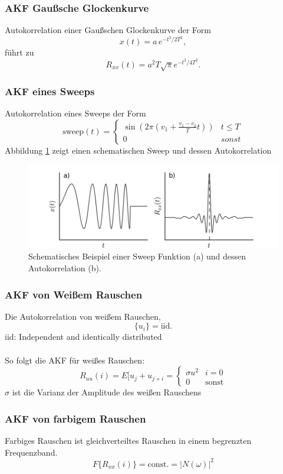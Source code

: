 \subsubsection*{AKF Gaußsche Glockenkurve}
Autokorrelation einer Gaußschen Glockenkurve der Form
\[
x(t) = a\,e^{-t^2/2T^2},
\]
führt zu
\[
R_{xx}(t) = a^2 T \sqrt{\pi} e^{-t^2/4T^2}.
\]

\subsubsection*{AKF eines Sweeps}
Autokorrelation eines Sweeps der Form
\[
\mbox{sweep}(t)=
\begin{cases}
\sin \left(2\pi \left(v_1 + \frac{v_1-v_2}{T} t \right)\right) & t \leq T\\
0& sonst
\end{cases}
\]
Abbildung \ref{fig:korr_sweep} zeigt einen schematischen Sweep und dessen Autokorrelation

\begin{figure}[h!]
\centering
\includegraphics[width=.9\tw]{fig/09-Korrelation/04-example_sweep.png}
\caption{Schematisches Beispiel einer Sweep Funktion (a) und dessen Autokorrelation (b).}
\label{fig:korr_sweep}
\end{figure}

\subsubsection*{AKF von Weißem Rauschen}
Die Autokorrelation von weißem Rauschen,
\[
\{u_i\} = \mbox{iid}.
\]
{\small iid: Independent and identically distributed}\\\\
So folgt die AKF für weißes Rauschen:
\[
R_{uu}(i) = E[u_j + u_{j+i} =
\begin{cases}
\sigma u^2 & i=0\\
0 & \mbox{sonst}
\end{cases}
\]
{\small $\sigma$ ist die Varianz der Amplitude des weißen Rauschens}

\subsubsection*{AKF von farbigem Rauschen}
Farbiges Rauschen ist gleichverteiltes Rauschen in einem begrenzten Frequenzband.
\[
F\{R_{xx}(i)\} = \mbox{const.} = |N(\omega)|^2
\]

